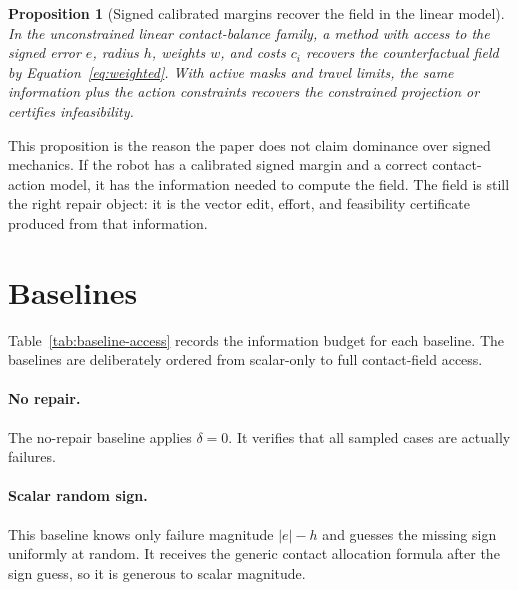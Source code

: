 \documentclass{article}
\newtheorem{proposition}{Proposition}
\begin{document}
\begin{proposition}[Signed calibrated margins recover the field in the linear model]
In the unconstrained linear contact-balance family, a method with access to the signed error $e$, radius $h$, weights $w$, and costs $c_i$ recovers the counterfactual field by Equation~\ref{eq:weighted}. With active masks and travel limits, the same information plus the action constraints recovers the constrained projection or certifies infeasibility.
\end{proposition}

This proposition is the reason the paper does not claim dominance over signed mechanics. If the robot has a calibrated signed margin and a correct contact-action model, it has the information needed to compute the field. The field is still the right repair object: it is the vector edit, effort, and feasibility certificate produced from that information.

\section{Baselines}

Table~\ref{tab:baseline-access} records the information budget for each baseline. The baselines are deliberately ordered from scalar-only to full contact-field access.

\begin{table}[t]
    \centering
    \caption{Baseline information access. The field is not compared only against weak scalar guesses; it is also compared against signed-margin and contact-aware repair rules.}
    \label{tab:baseline-access}
    \small
    
\end{table}

\paragraph{No repair.}
The no-repair baseline applies $\delta=0$. It verifies that all sampled cases are actually failures.

\paragraph{Scalar random sign.}
This baseline knows only failure magnitude $|e|-h$ and guesses the missing sign uniformly at random. It receives the generic contact allocation formula after the sign guess, so it is generous to scalar magnitude.
\end{document}
